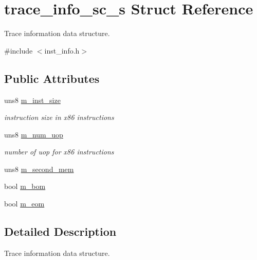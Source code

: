\hypertarget{structtrace__info__sc__s}{
\section{trace\_\-info\_\-sc\_\-s Struct Reference}
\label{structtrace__info__sc__s}
}


Trace information data structure.  




{\ttfamily \#include $<$inst\_\-info.h$>$}

\subsection*{Public Attributes}
\begin{DoxyCompactItemize}
\item 
\hypertarget{structtrace__info__sc__s_a07f8c7dd1b969fbf885f3be9942246e9}{
uns8 \hyperlink{structtrace__info__sc__s_a07f8c7dd1b969fbf885f3be9942246e9}{m\_\-inst\_\-size}}
\label{structtrace__info__sc__s_a07f8c7dd1b969fbf885f3be9942246e9}

\begin{DoxyCompactList}\small\item\em instruction size in x86 instructions \item\end{DoxyCompactList}\item 
\hypertarget{structtrace__info__sc__s_a1802d3699edd96ed927ff51c5dc95f8a}{
uns8 \hyperlink{structtrace__info__sc__s_a1802d3699edd96ed927ff51c5dc95f8a}{m\_\-num\_\-uop}}
\label{structtrace__info__sc__s_a1802d3699edd96ed927ff51c5dc95f8a}

\begin{DoxyCompactList}\small\item\em number of uop for x86 instructions \item\end{DoxyCompactList}\item 
uns8 \hyperlink{structtrace__info__sc__s_ab381d88d668a12004bf60dbf73bbc3a3}{m\_\-second\_\-mem}
\item 
bool \hyperlink{structtrace__info__sc__s_a0e15f565c3a432b13a5920e94fbea02c}{m\_\-bom}
\item 
bool \hyperlink{structtrace__info__sc__s_ac298237d1c88fdc18dd4a703b83a426f}{m\_\-eom}
\end{DoxyCompactItemize}


\subsection{Detailed Description}
Trace information data structure. 

